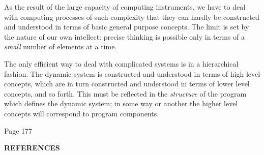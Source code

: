 As the result of the large capacity of computing instruments, we have to deal with computing processes of such complexity that they can hardly be constructed and understood in terms of basic general purpose concepts. The limit is set by the nature of our own intellect: precise thinking is possible only in terms of a \textit{small} number of elements at a time.

The only efficient way to deal with complicated systems is in a hierarchical fashion. The dynamic system is constructed and understood in terms of high level concepts, which are in turn constructed and understood in terms of lower level concepts, and so forth. This must be reflected in the \textit{structure} of the program which defines the dynamic system; in some way or another the higher level concepts will correspond to program components.

Page 177




\bigskip

\noindent
\textbf{REFERENCES}
\medskip\nopagebreak

